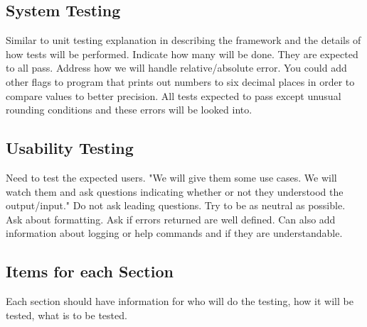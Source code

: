 \documentclass{report}
\begin{document}
\subsection{System Testing}
	Similar to unit testing explanation in describing the framework and the details of how tests will be performed. Indicate how many will be done. They are expected to all pass. Address how we will handle relative/absolute error. You could add other flags to program that prints out numbers to six decimal places in order to compare values to better precision. All tests expected to pass except unusual rounding conditions and these errors will be looked into.
\subsection{Usability Testing}
	Need to test the expected users. "We will give them some use cases. We will watch them and ask questions indicating whether or not they understood the output/input." Do not ask leading questions. Try to be as neutral as possible. Ask about formatting. Ask if errors returned are well defined. Can also add information about logging or help commands and if they are understandable.
\subsection{Items for each Section}
Each section should have information for who will do the testing, how it will be tested, what is to be tested.
\end{document}

